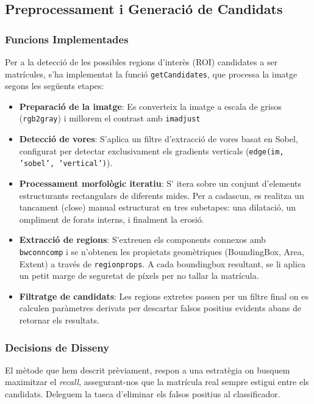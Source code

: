 
\subsection{Preprocessament i Generació de Candidats}

\subsubsection{Funcions Implementades}
Per a la detecció de les possibles regions d'interès (ROI) candidates a ser matrícules, s'ha implementat la funció \texttt{getCandidates}, que processa la imatge segons les següents etapes:
\begin{itemize}
    \item \textbf{Preparació de la imatge}: Es converteix la imatge a escala de grisos (\texttt{rgb2gray}) i millorem el contrast amb \texttt{imadjust}
    \item \textbf{Detecció de vores}: S'aplica un filtre d'extracció de vores basat en Sobel, configurat per detectar exclusivament els gradients verticals (\texttt{edge(im, 'sobel', 'vertical')}).
    \item \textbf{Processament morfològic iteratiu}: S' itera sobre un conjunt d'elements estructurants rectangulars de diferents mides. Per a cadascun, es realitza un tancament (close) manual estructurat en tres subetapes: una dilatació, un ompliment de forats interns, i finalment la erosió.
    \item \textbf{Extracció de regions}: S'extreuen els components connexos amb \texttt{bwconncomp} i se n'obtenen les propietats geomètriques (BoundingBox, Area, Extent) a través de \texttt{regionprops}. A cada boundingbox resultant, se li aplica un petit marge de seguretat de píxels per no tallar la matrícula.
    \item \textbf{Filtratge de candidats}: Les regions extretes passen per un filtre final on es calculen paràmetres derivats per descartar falsos positius evidents abans de retornar els resultats.
\end{itemize}

\subsubsection{Decisions de Disseny}
El mètode que hem descrit prèviament, respon a una estratègia on busquem maximitzar el \textit{recall}, assegurant-nos que la matrícula real sempre estigui entre els candidats. Deleguem la tasca d'eliminar els falsos positius al classificador.

